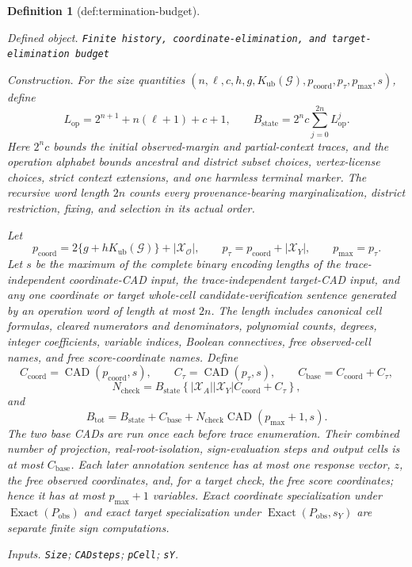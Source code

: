 \documentclass{article}
\newtheorem{definition}{Definition}
\begin{document}
\begin{definition}[def:termination-budget]\label{def:termination-budget}
\par\smallskip\noindent\emph{Defined object.} \texttt{Finite history,\allowbreak{} coordinate-\allowbreak{}elimination,\allowbreak{} and target-\allowbreak{}elimination budget}
\par\smallskip\noindent\emph{Construction.} For the size quantities \((n,\ell,c,h,g,K_{\mathrm{ub}}(\mathcal G),p_{\mathrm{coord}},p_{\tau},p_{\max},s)\), define
\[
L_{\mathrm{op}}=2^{n+1}+n(\ell+1)+c+1,
\qquad
B_{\mathrm{state}}=2^n c\sum_{j=0}^{2n}L_{\mathrm{op}}^j.
\]
Here \(2^n c\) bounds the initial observed-margin and partial-context traces, and the operation alphabet bounds ancestral and district subset choices, vertex-license choices, strict context extensions, and one harmless terminal marker. The recursive word length \(2n\) counts every provenance-bearing marginalization, district restriction, fixing, and selection in its actual order.

Let
\[
p_{\mathrm{coord}}
=2\{g+hK_{\mathrm{ub}}(\mathcal G)\}+|\mathcal X_{\mathcal O}|,
\qquad
p_{\tau}=p_{\mathrm{coord}}+|\mathcal X_Y|,
\qquad
p_{\max}=p_{\tau}.
\]
Let \(s\) be the maximum of the complete binary encoding lengths of the trace-independent coordinate-CAD input, the trace-independent target-CAD input, and any one coordinate or target whole-cell candidate-verification sentence generated by an operation word of length at most \(2n\). The length includes canonical cell formulas, cleared numerators and denominators, polynomial counts, degrees, integer coefficients, variable indices, Boolean connectives, free observed-cell names, and free score-coordinate names. Define
\[
C_{\mathrm{coord}}=\operatorname{CAD}(p_{\mathrm{coord}},s),
\qquad
C_{\tau}=\operatorname{CAD}(p_{\tau},s),
\qquad
C_{\mathrm{base}}=C_{\mathrm{coord}}+C_{\tau},
\]
\[
N_{\mathrm{check}}
=B_{\mathrm{state}}
\left\{|\mathcal X_A||\mathcal X_Y|C_{\mathrm{coord}}+C_{\tau}\right\},
\]
and
\[
B_{\mathrm{tot}}
=B_{\mathrm{state}}+C_{\mathrm{base}}
+N_{\mathrm{check}}\operatorname{CAD}(p_{\max}+1,s).
\]
The two base CADs are run once each before trace enumeration. Their combined number of projection, real-root-isolation, sign-evaluation steps and output cells is at most \(C_{\mathrm{base}}\). Each later annotation sentence has at most one response vector, \(z\), the free observed coordinates, and, for a target check, the free score coordinates; hence it has at most \(p_{\max}+1\) variables. Exact coordinate specialization under \(\operatorname{Exact}(P_{\mathrm{obs}})\) and exact target specialization under \(\operatorname{Exact}(P_{\mathrm{obs}},s_Y)\) are separate finite sign computations.
\par\smallskip\noindent\emph{Inputs.} \texttt{Size}; \texttt{CADsteps}; \texttt{pCell}; \texttt{sY}.
\end{definition}
\end{document}
